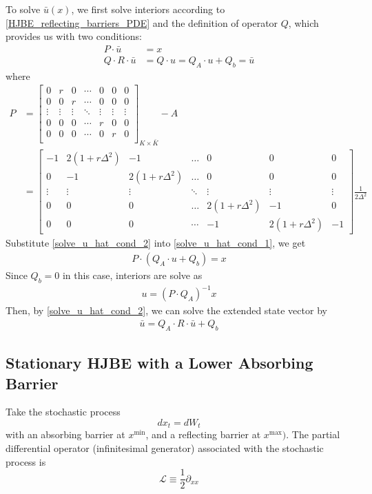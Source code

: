 \documentclass[11pt]{article}
\newcommand{\D}[1][]{\ensuremath{\partial_{#1}}}
\begin{document}
To solve $\bar{u}(x)$, we first solve interiors according to \eqref{HJBE_reflecting_barriers_PDE} and the definition of operator $Q$, which provides us with two conditions:
\begin{align}
P\cdot\bar{u} &= x\label{solve_u_hat_cond_1}\\
Q\cdot R\cdot\bar{u} &= Q\cdot u = Q_A\cdot u+Q_b = \bar{u}\label{solve_u_hat_cond_2}
\end{align}
where
\begin{align}
P &= \begin{bmatrix}
0&r&0&\cdots&0&0&0\\
0&0&r&\cdots&0&0&0\\
\vdots&\vdots&\vdots&\ddots&\vdots&\vdots&\vdots\\
0&0&0&\cdots&r&0&0\\
0&0&0&\cdots&0&r&0\\
\end{bmatrix}_{K\times\bar{K}}-A  \\
&= \begin{bmatrix}
-1&2(1+r\Delta^2)&-1&\dots&0&0&0\\
0&-1&2(1+r\Delta^2)&\dots&0&0&0\\
\vdots&\vdots&\vdots&\ddots&\vdots&\vdots&\vdots\\
0&0&0&\dots&2(1+r\Delta^2)&-1&0\\
0&0&0&\cdots&-1&2(1+r\Delta^2)&-1
\end{bmatrix}\frac{1}{2\Delta^{2}}
\end{align}
Substitute \eqref{solve_u_hat_cond_2} into \eqref{solve_u_hat_cond_1}, we get
\begin{align}
P\cdot(Q_A\cdot u+Q_b) = x
\end{align}
Since $Q_b = 0$ in this case, interiors are solve as
\begin{align}
u = (P\cdot Q_A)^{-1}x
\end{align}
Then, by \eqref{solve_u_hat_cond_2}, we can solve the extended state vector by
\begin{align}
\bar{u} = Q_A\cdot R\cdot\bar{u}+Q_b\label{solve_u_hat_in_terms_of_interiors}
\end{align}

\subsection{Stationary HJBE with a Lower Absorbing Barrier}
Take the stochastic process
$$
d x_t = d W_t
$$
with an absorbing barrier at $x^{\min}$, and a reflecting barrier at $x^{\max})$.  The partial differential operator (infinitesimal generator) associated with the stochastic process is
$$
\mathcal{L} \equiv \frac{1}{2}\D[xx]
$$
\end{document}
